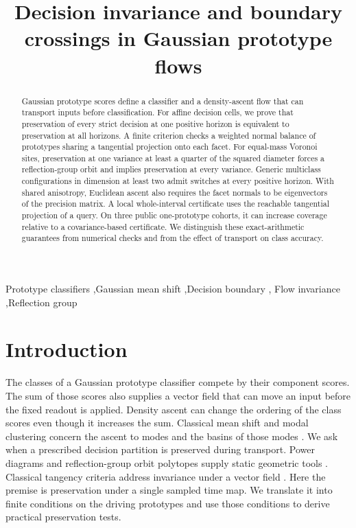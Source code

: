 \documentclass[final,5p,twocolumn]{elsarticle}
\begin{document}
\begin{frontmatter}
\title{Decision invariance and boundary crossings in Gaussian prototype flows}
\begin{abstract}
Gaussian prototype scores define a classifier and a density-ascent flow that can
transport inputs before classification. For affine decision cells, we prove that
preservation of every strict decision at one positive horizon is equivalent to
preservation at all horizons. A finite criterion checks a weighted normal
balance of prototypes sharing a tangential projection onto each facet. For
equal-mass Voronoi sites, preservation at one variance at least a quarter of the
squared diameter forces a reflection-group orbit and implies preservation at
every variance. Generic multiclass configurations in dimension at least two
admit switches at every positive horizon. With shared anisotropy, Euclidean ascent also requires the
facet normals to be eigenvectors of the precision matrix. A local
whole-interval certificate uses the reachable tangential projection of a query.
On three public one-prototype cohorts, it can increase coverage relative to a
covariance-based certificate. We distinguish these exact-arithmetic guarantees
from numerical checks and from the effect of transport on class accuracy.
\end{abstract}
\begin{keyword}
Prototype classifiers \sep Gaussian mean shift \sep Decision boundary \sep
Flow invariance \sep Reflection group
\end{keyword}
\end{frontmatter}
\thispagestyle{plain}

\section{Introduction}

The classes of a Gaussian prototype classifier compete by their component
scores. The sum of those scores also supplies a vector field that can move an
input before the fixed readout is applied. Density ascent can change the
ordering of the class scores even though it increases the sum.
Classical mean shift and modal clustering concern the ascent to modes and
the basins of those modes \cite{carreira,chacon}. We ask when a prescribed
decision partition is preserved during transport. Power diagrams and
reflection-group orbit polytopes supply static geometric tools
\cite{aurenhammer,ardila}. Classical tangency criteria address invariance
under a vector field \cite{nagumo}. Here the premise is preservation under a
single sampled time map. We translate it into finite conditions on the
driving prototypes and use those conditions to derive practical
preservation tests.
\end{document}
